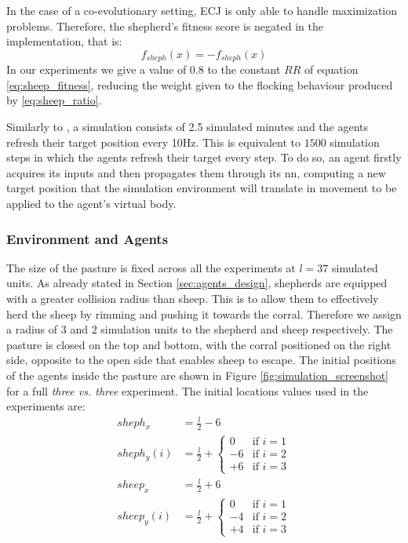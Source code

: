 \documentclass[conference]{IEEEtran}
\begin{document}
In the case of a co-evolutionary setting, ECJ is only able to handle maximization problems. Therefore, the shepherd's fitness score is negated in the implementation, that is:
$$ f_{sheph}(x) = -f_{sheph}(x) $$
In our experiments we give a value of $0.8$ to the constant $RR$ of equation \eqref{eq:sheep_fitness}, reducing the weight given to the flocking behaviour produced by \eqref{eq:sheep_ratio}.

Similarly to \cite{potter2001heterogeneity}, a simulation consists of 2.5 simulated minutes and the agents refresh their target position every 10Hz.
This is equivalent to $1500$ simulation steps in which the agents refresh their target every step.
To do so, an agent firstly acquires its inputs and then propagates them through its \gls{nn}, computing a new target position that the simulation environment will translate in movement to be applied to the agent's virtual body.

\vspace{0.5em}
\subsubsection{Environment and Agents}
The size of the pasture is fixed across all the experiments at $l = 37$ simulated units.
As already stated in Section \ref{sec:agents_design}, shepherds are equipped with a greater collision radius than sheep.
This is to allow them to effectively herd the sheep by rimming and pushing it towards the corral.
Therefore we assign a radius of $3$ and $2$ simulation units to the shepherd and sheep respectively.
The pasture is closed on the top and bottom, with the corral positioned on the right side, opposite to the open side that enables sheep to escape.
The initial positions of the agents inside the pasture are shown in Figure \ref{fig:simulation_screenshot} for a full \textit{three vs. three} experiment.
The initial locations values used in the experiments are:
\begin{align}
sheph_x &= \frac{l}{2} - 6 \\
sheph_y(i) &= \frac{l}{2} + \begin{cases} 0 & \text{if } i=1 \\ -6 & \text{if } i=2 \\ +6 & \text{if } i=3 \end{cases} \\
sheep_x &= \frac{l}{2} + 6 \\
sheep_y(i) &= \frac{l}{2} + \begin{cases} 0 & \text{if } i=1 \\ -4 & \text{if } i=2 \\ +4 & \text{if } i=3 \end{cases}
\end{align}
\end{document}
